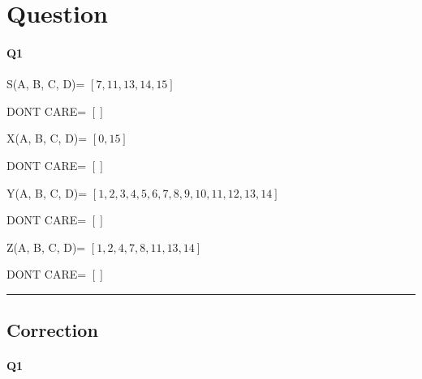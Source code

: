 
\section{Question}


\paragraph{Q1}


S(A, B, C, D)= $[7, 11, 13, 14, 15]$

DONT CARE= $[]$

X(A, B, C, D)= $[0, 15]$

DONT CARE= $[]$

Y(A, B, C, D)= $[1, 2, 3, 4, 5, 6, 7, 8, 9, 10, 11, 12, 13, 14]$

DONT CARE= $[]$

Z(A, B, C, D)= $[1, 2, 4, 7, 8, 11, 13, 14]$

DONT CARE= $[]$



\hrule width 1\linewidth
\pagebreak

\subsection{Correction}


\paragraph{Q1}

